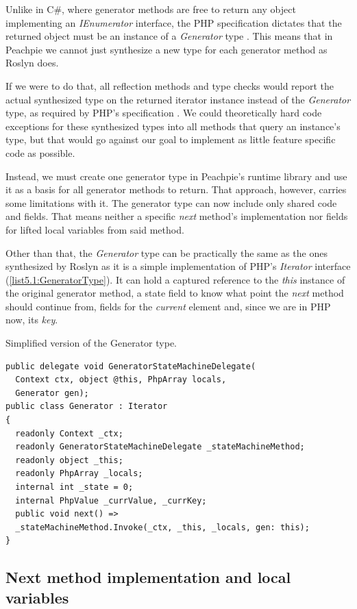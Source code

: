 Unlike in C\#, where generator methods are free to return any object implementing an \emph{IEnumerator} interface, the PHP specification dictates that the returned object must be an instance of a \emph{Generator} type \citep{GenPHP, GenPHPRFC}. This means that in Peachpie we cannot just synthesize a new type for each generator method as Roslyn does.

If we were to do that, all reflection methods and type checks would report the actual synthesized type on the returned iterator instance instead of the \emph{Generator} type, as required by PHP’s specification . We could theoretically hard code exceptions for these synthesized types into all methods that query an instance’s type, but that would go against our goal to implement as little feature specific code as possible.

Instead, we must create one generator type in Peachpie’s runtime library and use it as a basis for all generator methods to return. That approach, however, carries some limitations with it. The generator type can now include only shared code and fields. That means neither a specific \emph{next} method’s implementation nor fields for lifted local variables from said method.

Other than that, the \emph{Generator} type can be practically the same as the ones synthesized by Roslyn as it is a simple implementation of PHP's \emph{Iterator} interface (\autoref{list5.1:GeneratorType}). It can hold a captured reference to the \emph{this} instance of the original generator method, a state field to know what point the \emph{next} method should continue from,  fields for the \emph{current} element and, since we are in PHP now, its \emph{key}.

\begin{listing}[H]
\caption{Simplified version of the Generator type.}
\label{list5.1:GeneratorType}
\begin{verbatim}
public delegate void GeneratorStateMachineDelegate(
  Context ctx, object @this, PhpArray locals, 
  Generator gen);
public class Generator : Iterator
{
  readonly Context _ctx;
  readonly GeneratorStateMachineDelegate _stateMachineMethod;
  readonly object _this;
  readonly PhpArray _locals;
  internal int _state = 0;
  internal PhpValue _currValue, _currKey;
  public void next() =>
  _stateMachineMethod.Invoke(_ctx, _this, _locals, gen: this);
}
\end{verbatim}
\end{listing}

\subsection{Next method implementation and local variables}


